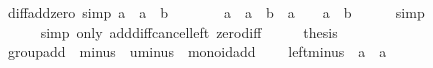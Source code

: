 \begin{isabellebody}
\isanewline
\isanewline
{}\isamarkupfalse%
\ diff{\isacharunderscore}{\kern0pt}add{\isacharunderscore}{\kern0pt}zero\ {\isacharbrackleft}{\kern0pt}simp{\isacharbrackright}{\kern0pt}{\isacharcolon}{\kern0pt}\ {\isachardoublequoteopen}a\ {\isacharminus}{\kern0pt}\ {\isacharparenleft}{\kern0pt}a\ {\isacharplus}{\kern0pt}\ b{\isacharparenright}{\kern0pt}\ {\isacharequal}{\kern0pt}\ {}{\isachardoublequoteclose}\isanewline
%
\isadelimproof
%
\endisadelimproof
%
\isatagproof
{}\isamarkupfalse%
\ {\isacharminus}{\kern0pt}\isanewline
\ \ \isamarkupfalse%
\ {\isachardoublequoteopen}a\ {\isacharminus}{\kern0pt}\ {\isacharparenleft}{\kern0pt}a\ {\isacharplus}{\kern0pt}\ b{\isacharparenright}{\kern0pt}\ {\isacharequal}{\kern0pt}\ {\isacharparenleft}{\kern0pt}a\ {\isacharplus}{\kern0pt}\ {}{\isacharparenright}{\kern0pt}\ {\isacharminus}{\kern0pt}\ {\isacharparenleft}{\kern0pt}a\ {\isacharplus}{\kern0pt}\ b{\isacharparenright}{\kern0pt}{\isachardoublequoteclose}\isanewline
\ \ \ \ \isamarkupfalse%
\ simp\isanewline
\ \ \isamarkupfalse%
\ \isamarkupfalse%
\ {\isachardoublequoteopen}{\isasymdots}\ {\isacharequal}{\kern0pt}\ {}{\isachardoublequoteclose}\isanewline
\ \ \ \ \isamarkupfalse%
\ {\isacharparenleft}{\kern0pt}simp\ only{\isacharcolon}{\kern0pt}\ add{\isacharunderscore}{\kern0pt}diff{\isacharunderscore}{\kern0pt}cancel{\isacharunderscore}{\kern0pt}left\ zero{\isacharunderscore}{\kern0pt}diff{\isacharparenright}{\kern0pt}\isanewline
\ \ \isamarkupfalse%
\ \isamarkupfalse%
\ {\isacharquery}{\kern0pt}thesis\ \isacommand{{\isachardot}{\kern0pt}}\isamarkupfalse%
\isanewline
{}\isamarkupfalse%
%
\endisatagproof
{\isafoldproof}%
%
\isadelimproof
\isanewline
%
\endisadelimproof
\isanewline
{}\isamarkupfalse%
%
\isadelimdocument
%
\endisadelimdocument
%
\isatagdocument
%
\isamarkuptrue%
%
\endisatagdocument
{\isafolddocument}%
%
\isadelimdocument
%
\endisadelimdocument
{}\isamarkupfalse%
\ group{\isacharunderscore}{\kern0pt}add\ {\isacharequal}{\kern0pt}\ minus\ {\isacharplus}{\kern0pt}\ uminus\ {\isacharplus}{\kern0pt}\ monoid{\isacharunderscore}{\kern0pt}add\ {\isacharplus}{\kern0pt}\isanewline
\ \ \ left{\isacharunderscore}{\kern0pt}minus{\isacharcolon}{\kern0pt}\ {\isachardoublequoteopen}{\isacharminus}{\kern0pt}\ a\ {\isacharplus}{\kern0pt}\ a\ {\isacharequal}{\kern0pt}\ {}{\isachardoublequoteclose}\isanewline

\end{isabellebody}
